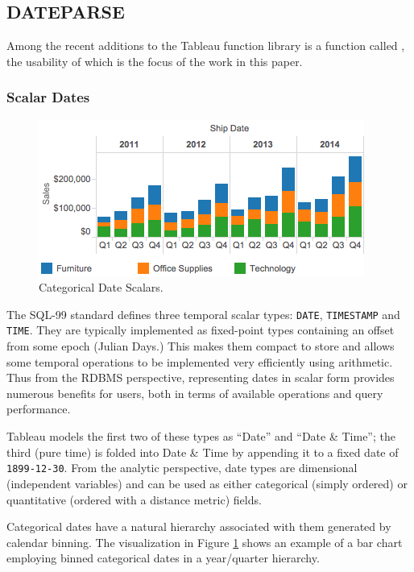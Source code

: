 \subsection{DATEPARSE}
Among the recent additions to the Tableau function library is a function called \dateparse, the usability of which is the focus of the work in this paper.

\subsubsection{	Scalar Dates}


\begin{figure}[ht]
\centering
\includegraphics[width=\columnwidth]{figures/FigureI1}
\caption{Categorical Date Scalars.}
\label{fig:I1}
\end{figure}


The SQL-99 standard defines three temporal scalar types: \texttt{DATE}, \texttt{TIMESTAMP} and \texttt{TIME}. They are typically implemented as fixed-point types containing an offset from some epoch (\eg Julian Days.) This makes them compact to store and allows some temporal operations to be implemented very efficiently using arithmetic. Thus from the RDBMS perspective, representing dates in scalar form provides numerous benefits for users, both in terms of available operations and query performance.

Tableau models the first two of these types as ``Date'' and ``Date \& Time''; the third (pure time) is folded into Date \& Time by appending it to a fixed date of \texttt{1899-12-30}. From the analytic perspective, date types are dimensional (\ie independent variables) and can be used as either categorical (simply ordered) or quantitative (ordered with a distance metric) fields.

Categorical dates have a natural hierarchy associated with them generated by calendar binning. The visualization in Figure \ref{fig:I1} shows an example of a bar chart employing binned categorical dates in a year/quarter hierarchy.

